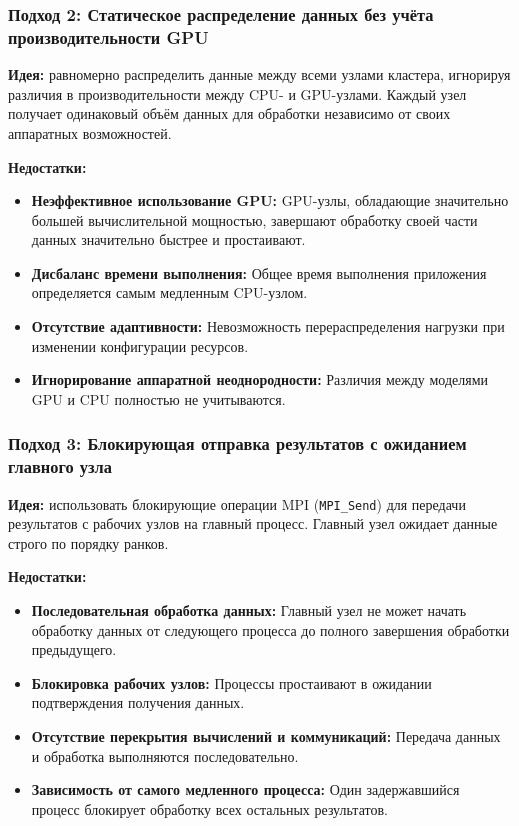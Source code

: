 \documentclass[areaset=advanced]{scrartcl}
\begin{document}
\subsubsection{Подход 2: Статическое распределение данных без учёта производительности GPU}

\textbf{Идея:} равномерно распределить данные между всеми узлами кластера,
игнорируя различия в производительности между CPU- и GPU-узлами. Каждый узел
получает одинаковый объём данных для обработки независимо от своих аппаратных
возможностей.

\textbf{Недостатки:}
\begin{itemize}
    \item \textbf{Неэффективное использование GPU:} GPU-узлы, обладающие значительно
    большей вычислительной мощностью, завершают обработку своей части данных
    значительно быстрее и простаивают.
    \item \textbf{Дисбаланс времени выполнения:} Общее время выполнения приложения
    определяется самым медленным CPU-узлом.
    \item \textbf{Отсутствие адаптивности:} Невозможность перераспределения нагрузки
    при изменении конфигурации ресурсов.
    \item \textbf{Игнорирование аппаратной неоднородности:} Различия между моделями
    GPU и CPU полностью не учитываются.
\end{itemize}

\subsubsection{Подход 3: Блокирующая отправка результатов с ожиданием главного узла}

\textbf{Идея:} использовать блокирующие операции MPI (\texttt{MPI\_Send}) для
передачи результатов с рабочих узлов на главный процесс. Главный узел ожидает
данные строго по порядку ранков.

\textbf{Недостатки:}
\begin{itemize}
    \item \textbf{Последовательная обработка данных:} Главный узел не может начать
    обработку данных от следующего процесса до полного завершения обработки
    предыдущего.
    \item \textbf{Блокировка рабочих узлов:} Процессы простаивают в ожидании
    подтверждения получения данных.
    \item \textbf{Отсутствие перекрытия вычислений и коммуникаций:} Передача данных
    и обработка выполняются последовательно.
    \item \textbf{Зависимость от самого медленного процесса:} Один задержавшийся
    процесс блокирует обработку всех остальных результатов.
\end{itemize}
\end{document}
